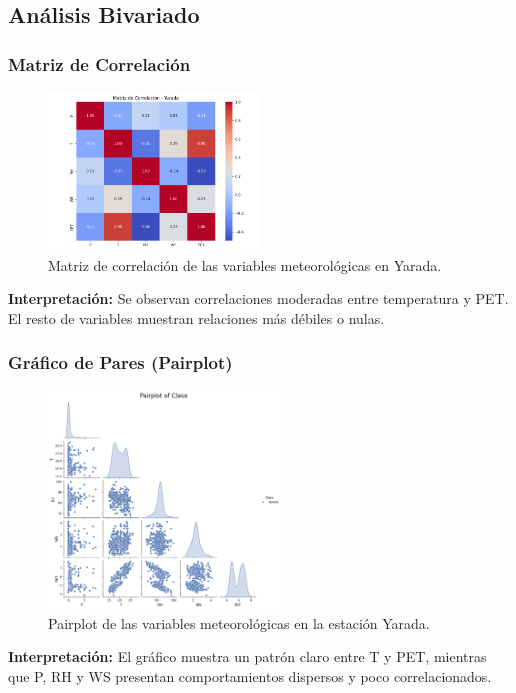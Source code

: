 \subsection{Análisis Bivariado}

\subsubsection*{Matriz de Correlación}
\begin{figure}[H]
\centering
\includegraphics[width=0.5\textwidth]{resultados/por_estacion_meteorologica/Yarada/matriz_correlacion.png}
\caption{Matriz de correlación de las variables meteorológicas en Yarada.}
\label{fig:yarada_corr}
\end{figure}
\textbf{Interpretación:} Se observan correlaciones moderadas entre temperatura y PET. El resto de variables muestran relaciones más débiles o nulas.

\subsubsection*{Gráfico de Pares (Pairplot)}
\begin{figure}[H]
\centering
\includegraphics[width=0.55\textwidth]{resultados/por_estacion_meteorologica/Yarada/pairplot.png}
\caption{Pairplot de las variables meteorológicas en la estación Yarada.}
\label{fig:yarada_pairplot}
\end{figure}
\textbf{Interpretación:} El gráfico muestra un patrón claro entre T y PET, mientras que P, RH y WS presentan comportamientos dispersos y poco correlacionados.






